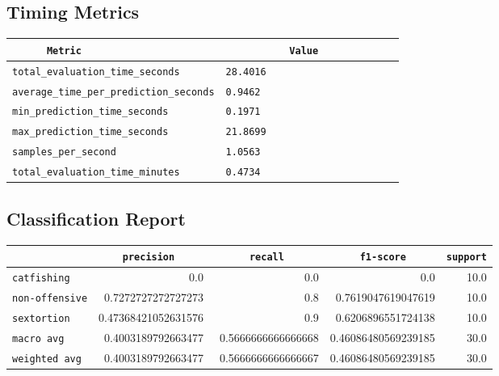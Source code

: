 \documentclass{article}
\begin{document}
\subsection{Timing Metrics}

\begin{center}
\begin{tabular}{l | l} \hline
    \verb|      Metric     | & \verb|           Value           | \\ \hline
    \hline
    \verb|total_evaluation_time_seconds| & \verb|28.4016                      | \\ \hline
    \verb|average_time_per_prediction_seconds| & \verb|0.9462                       | \\ \hline
    \verb|min_prediction_time_seconds| & \verb|0.1971                       | \\ \hline
    \verb|max_prediction_time_seconds| & \verb|21.8699                      | \\ \hline
    \verb|samples_per_second| & \verb|1.0563                       | \\ \hline
    \verb|total_evaluation_time_minutes| & \verb|0.4734                       | \\ \hline
\end{tabular}
\end{center}

\subsection{Classification Report}

\begin{center}
\begin{tabular}{l | r | r | r | r} \hline
    \verb|            | & \verb|    precision     | & \verb|      recall      | & \verb|     f1-score     | & \verb|support| \\ \hline
    \hline
    \verb|catfishing | & 0.0 & 0.0 & 0.0 &    10.0 \\ \hline
    \verb|non-offensive| & 0.7272727272727273 & 0.8 & 0.7619047619047619 &    10.0 \\ \hline
    \verb|sextortion | & 0.47368421052631576 & 0.9 & 0.6206896551724138 &    10.0 \\ \hline
    \verb|macro avg  | & 0.4003189792663477 & 0.5666666666666668 & 0.46086480569239185 &    30.0 \\ \hline
    \verb|weighted avg| & 0.4003189792663477 & 0.5666666666666667 & 0.46086480569239185 &    30.0 \\ \hline
\end{tabular}
\end{center}
\end{document}
